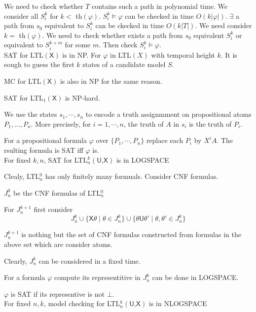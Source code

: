 \documentclass[12pt]{article}
\begin{document}
We need to check whether $T$ contains such a path in polynomial time. We consider all $S^k_i$ for $k<$ th$(\varphi)$. $S^k_i\models \varphi$ can be checked in time $O(k|\varphi|)$. $\exists $ a path from $s_0$ equivalent to $S^k_i$ can be ckecked in time $O(k|T|)$. We need consider $k=$ th$(\varphi)$. We need to check whether exists a path from $s_0$ equivalent $S^k_i$ or equivalent to $S^{k+m}_i$ for some $m$. Then check $S^k_i\models\varphi$.\\



SAT for LTL$(\textsf{X})$ is in NP. For $\varphi$ in LTL$(X)$ with temporal height $k$.  It is eough to guess the first $k$ states of a candidate model $S$. 

MC for LTL$(\textsf{X})$ is also in NP for the same reason.


SAT for LTL$_1(\textsf{X})$ is NP-hard. 

We use the states $s_1,\cdots, s_n$ to encode a truth assignmment on propositional atoms $P_1,\dots, P_n$. More precisely, for $i=1,\cdots, n$, the truth of $A$ in $s_i$ is the truth of $P_i$. 

For a propositional formula $\varphi$ over $\{P_1,\cdots, P_n\}$ replace each $P_i$ by $X^iA$. The rsulting formula is SAT iff $\varphi$ is.\\




For fixed $k,n$, SAT for LTL$_n^k(\textsf{U,X})$ is in LOGSPACE

Clealy, LTL$^0_n$ has only finitely many formuals. Consider CNF formulas.

$J_n^0$ be the CNF formulas of LTL$^0_n$

For $J_n^{k+1}$ first consider
%
$$J_n^k\cup\{\textsf{X}\theta\mid \theta\in J_n^k\}\cup\{\theta\textsf{U}\theta'\mid \theta,\theta'\in J^k_n\}$$

$J_n^{k+1}$ is nothing but the set of CNF formulas constructed from formulas in the above set which are consider atoms.


Clearly, $J_n^k$ can be considered in a fixed time.

For a formula $\varphi$ compute its representitive in $J^k_n$ can be done in LOGSPACE.


$\varphi$ is SAT if its representive is not $\bot$.
\\


For fixed $n,k$, model checking for LTL$_n^k(\textsf{U,X})$ is in NLOGSPACE
\end{document}
